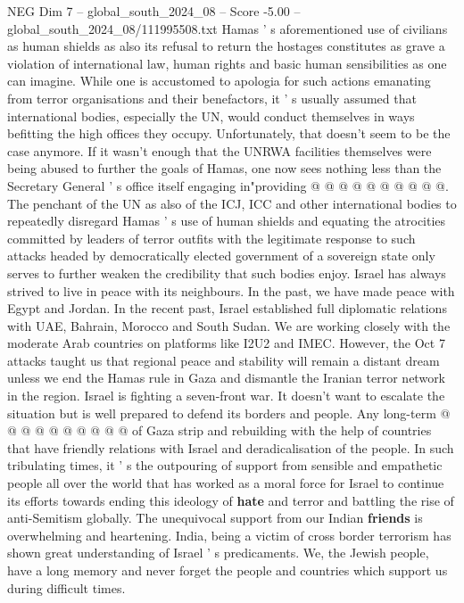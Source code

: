 \begin{textsample}{NEG Dim 7 – global\_south\_2024\_08 – Score -5.00 – global\_south\_2024\_08/111995508.txt}
Hamas ' s aforementioned use of civilians as human shields as also its refusal to return the hostages constitutes as grave a violation of international law, human rights and basic human sensibilities as one can imagine.
While one is accustomed to apologia for such actions emanating from terror organisations and their benefactors, it ' s usually assumed that international bodies, especially the UN, would conduct themselves in ways befitting the high offices they occupy.
Unfortunately, that doesn't seem to be the case anymore.
If it wasn't enough that the UNRWA facilities themselves were being abused to further the goals of Hamas, one now sees nothing less than the Secretary General ' s office itself engaging in"providing @ @ @ @ @ @ @ @ @ @.
The penchant of the UN as also of the ICJ, ICC and other international bodies to repeatedly disregard Hamas ' s use of human shields and equating the atrocities committed by leaders of terror outfits with the legitimate response to such attacks headed by democratically elected government of a sovereign state only serves to further weaken the credibility that such bodies enjoy.
Israel has always strived to live in peace with its neighbours.
In the past, we have made peace with Egypt and Jordan.
In the recent past, Israel established full diplomatic relations with UAE, Bahrain, Morocco and South Sudan.
We are working closely with the moderate Arab countries on platforms like I2U2 and IMEC.
However, the Oct 7 attacks taught us that regional peace and stability will remain a distant dream unless we end the Hamas rule in Gaza and dismantle the Iranian terror network in the region.
Israel is fighting a seven-front war.
It doesn't want to escalate the situation but is well prepared to defend its borders and people.
Any long-term @ @ @ @ @ @ @ @ @ @ of Gaza strip and rebuilding with the help of countries that have friendly relations with Israel and deradicalisation of the people.
In such tribulating times, it ' s the outpouring of support from sensible and empathetic people all over the world that has worked as a moral force for Israel to continue its efforts towards ending this ideology of \textbf{hate} and terror and battling the rise of anti-Semitism globally.
The unequivocal support from our Indian \textbf{friends} is overwhelming and heartening.
India, being a victim of cross border terrorism has shown great understanding of Israel ' s predicaments.
We, the Jewish people, have a long memory and never forget the people and countries which support us during difficult times.

\end{textsample}
